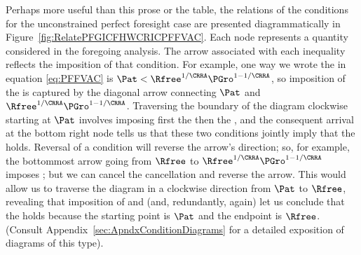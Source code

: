 \documentclass[BufferStockTheory]{subfiles}
\begin{document}
Perhaps more useful than this prose or the table,  the relations of the conditions for the unconstrained perfect foresight case are presented diagrammatically in Figure~\ref{fig:RelatePFGICFHWCRICPFFVAC}.  Each node represents a quantity considered in the foregoing analysis.  The arrow associated with each inequality reflects the imposition of that condition.  For example, one way we wrote the {\PFFVAC} in equation \eqref{eq:PFFVAC} is $\Pat < \Rfree^{1/\CRRA} \PGro^{1-1/\CRRA}$, so imposition of the {\PFFVAC} is captured by the diagonal arrow connecting $\Pat$ and $\Rfree^{1/\CRRA}\PGro^{1-1/\CRRA}$.  Traversing the boundary of the diagram clockwise starting at $\Pat$ involves imposing first the {\GICAbs} then the {\FHWC}, and the consequent arrival at the bottom right node tells us that these two conditions jointly imply that the {\PFFVAC} holds.  Reversal of a condition will reverse the arrow's direction; so, for example, the bottommost arrow going from $\Rfree$ to $\Rfree^{1/\CRRA}\PGro^{1-1/\CRRA}$ imposes {\cncl{\FHWC}}; but we can cancel the cancellation and reverse the arrow.  This would allow us to traverse the diagram in a clockwise direction from $\Pat$ to $\Rfree$, revealing that imposition of {\GICAbs} and {\FHWC} (and, redundantly, {\FHWC} again) let us conclude that the {\RIC} holds because the starting point is $\Pat$ and the endpoint is $\Rfree$.  (Consult Appendix~\ref{sec:ApndxConditionDiagrams} for a detailed exposition of diagrams of this type).



\begin{comment}
\begin{align}
  \DiscFac \Pat^{1-\CRRA} & < 1
\\ \DiscFac \Rfree \Pat^{1-\CRRA} & < \Rfree  
\\ (\DiscFac \Rfree)^{1/\CRRA} \Pat^{1/\CRRA-1} & < (\Rfree)^{1/\CRRA}
\\ \Pat^{1/\CRRA} & < (\Rfree)^{1/\CRRA}
\\ \Pat/\Rfree & < 1
\end{align}
\begin{align}
  \left(\frac{1-(\Rfree \DiscFac)^{1/\CRRA}/\Rfree}{1-\DiscFac (\DiscFac \Rfree)^{1/\CRRA-1}}\right)
  
\end{align}

\begin{align}
1/\Rfree & ? \DiscFac (\DiscFac \Rfree)^{-1}
1/\DiscFac\Rfree & ?  (\DiscFac \Rfree)^{-1}
\end{align}
\end{comment}
\end{document}
